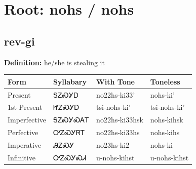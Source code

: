 \documentclass{article}%
\begin{document}
%
\normalsize%
\section*{Root: nohs / nohs}%
\subsection*{rev-gi}%
\textbf{Definition: }%
he/she is stealing it%
\\[0.5em]%
\begin{tabular}{|l|l|l|l|}%
\hline%
\textbf{Form}&\textbf{Syllabary}&\textbf{With Tone}&\textbf{Toneless}\\%
\hline%
Present&ᎦᏃᏍᎩᎠ&no22hs{-}ki33'&nohs{-}ki'\\%
1st Present&ᏥᏃᏍᎩᎠ&tsi{-}nohs{-}ki'&tsi{-}nohs{-}ki'\\%
Imperfective&ᎦᏃᏍᎩᏍᎪᎢ&no22hs{-}ki33hsk&nohs{-}kihsk\\%
Perfective&ᎤᏃᏍᎩᏒᎢ&no22hs{-}ki33hs&nohs{-}kihs\\%
Imperative&ᎯᏃᏍᎩ&no23hs{-}ki2&nohs{-}ki\\%
Infinitive&ᎤᏃᏍᎩᏍᏗ&u{-}nohs{-}kihst&u{-}nohs{-}kihst\\%
\hline%
\end{tabular}%
\\[1em]%
\end{document}
